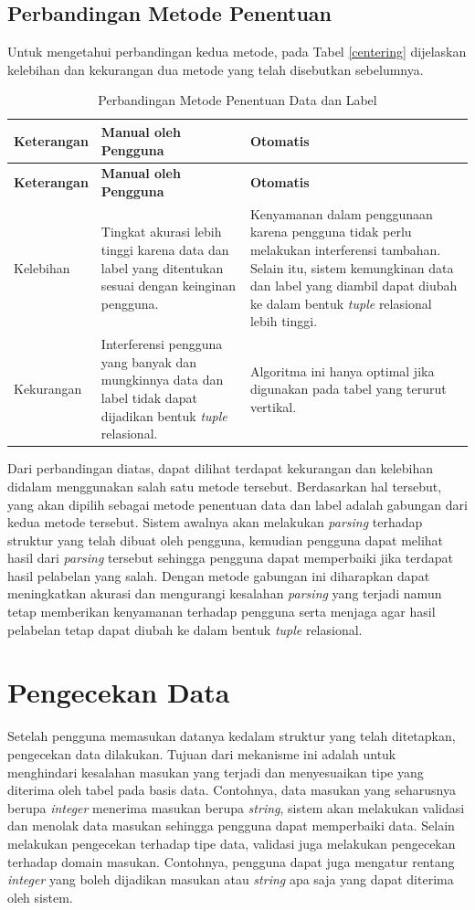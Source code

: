 	\subsection{Perbandingan Metode Penentuan}
	Untuk mengetahui perbandingan kedua metode, pada Tabel \ref{centering} dijelaskan kelebihan dan kekurangan dua metode yang telah disebutkan sebelumnya.
	\begin{longtable}{ | p{3cm} | p{4cm} | p{4cm} | }
	    \caption{Perbandingan Metode Penentuan Data dan Label}
	    \label{MetodePenentuan}\\ \hline
	    \centering\bfseries{Keterangan} & \centering\bfseries{Manual oleh Pengguna} & \centering\bfseries{Otomatis} \tabularnewline \hline
	    \endfirsthead
	    \hline
	    \centering\bfseries{Keterangan} & \centering\bfseries{Manual oleh Pengguna} & \centering\bfseries{Otomatis} \tabularnewline \hline
	    \endhead
	    Kelebihan & Tingkat akurasi lebih tinggi karena data dan label yang ditentukan sesuai dengan keinginan pengguna. & Kenyamanan dalam penggunaan karena pengguna tidak perlu melakukan interferensi tambahan. Selain itu, sistem kemungkinan data dan label yang diambil dapat diubah ke dalam bentuk \textit{tuple} relasional lebih tinggi. \\ \hline
	    Kekurangan & Interferensi pengguna yang banyak dan mungkinnya data dan label tidak dapat dijadikan bentuk \textit{tuple} relasional. & Algoritma ini hanya optimal jika digunakan pada tabel yang terurut vertikal. \\ \hline
  	\end{longtable}
  	Dari perbandingan diatas, dapat dilihat terdapat kekurangan dan kelebihan didalam menggunakan salah satu metode tersebut. Berdasarkan hal tersebut, yang akan dipilih sebagai metode penentuan data dan label adalah gabungan dari kedua metode tersebut. Sistem awalnya akan melakukan \textit{parsing} terhadap struktur yang telah dibuat oleh pengguna, kemudian pengguna dapat melihat hasil dari \textit{parsing} tersebut sehingga pengguna dapat memperbaiki jika terdapat hasil pelabelan yang salah. Dengan metode gabungan ini diharapkan dapat meningkatkan akurasi dan mengurangi kesalahan \textit{parsing} yang terjadi namun tetap memberikan kenyamanan terhadap pengguna serta menjaga agar hasil pelabelan tetap dapat diubah ke dalam bentuk \textit{tuple} relasional.

\section{Pengecekan Data}
Setelah pengguna memasukan datanya kedalam struktur yang telah ditetapkan, pengecekan data dilakukan. Tujuan dari mekanisme ini adalah untuk menghindari kesalahan masukan yang terjadi dan menyesuaikan tipe yang diterima oleh tabel pada basis data. Contohnya, data masukan yang seharusnya berupa \textit{integer} menerima masukan berupa \textit{string}, sistem akan melakukan validasi dan menolak data masukan sehingga pengguna dapat memperbaiki data. Selain melakukan pengecekan terhadap tipe data, validasi juga melakukan pengecekan terhadap domain masukan. Contohnya, pengguna dapat juga mengatur rentang \textit{integer} yang boleh dijadikan masukan atau \textit{string} apa saja yang dapat diterima oleh sistem.

